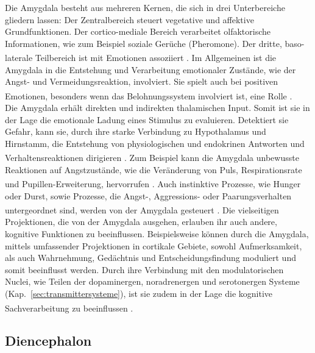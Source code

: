 \documentclass[12pt,a4paper,pdftex]{article}
\begin{document}
\noindent Die Amygdala besteht aus mehreren Kernen, die sich in drei Unterbereiche gliedern lassen: Der Zentralbereich steuert vegetative und affektive Grundfunktionen. Der cortico-mediale Bereich verarbeitet olfaktorische Informationen, wie zum Beispiel soziale Gerüche (Pheromone). Der dritte, baso-laterale Teilbereich ist mit Emotionen assoziiert \textsuperscript{\cite[6]{storch2012lehrbuchzoo}}. Im Allgemeinen ist die Amygdala in die Entstehung und Verarbeitung emotionaler Zustände, wie der Angst- und   Vermeidungsreaktion, involviert. Sie spielt auch bei positiven Emotionen, besonders wenn das Belohnungssystem involviert ist, eine Rolle \textsuperscript{\cite[48]{kandel2013principles}}.\\
Die Amygdala erhält direkten und indirekten thalamischen Input. Somit ist sie in der Lage die emotionale Ladung eines Stimulus zu evaluieren. Detektiert sie Gefahr, kann sie, durch ihre starke  Verbindung zu Hypothalamus und Hirnstamm, die Entstehung von physiologischen und endokrinen Antworten und Verhaltensreaktionen dirigieren \textsuperscript{\cite[48]{kandel2013principles}}. Zum Beispiel kann die Amygdala unbewusste Reaktionen auf Angstzustände, wie die Veränderung von Puls, Respirationsrate und Pupillen-Erweiterung,  hervorrufen \textsuperscript{\cite[15]{kandel2013principles}}.
Auch instinktive Prozesse, wie Hunger oder Durst, sowie Prozesse, die Angst-, Aggressions- oder Paarungsverhalten untergeordnet sind, werden von der Amygdala gesteuert \textsuperscript{\cite[18]{kandel2013principles}}.
Die vielseitigen Projektionen, die von der Amygdala ausgehen, erlauben ihr auch andere, kognitive Funktionen zu beeinflussen. Beispielsweise können durch die Amygdala, mittels umfassender Projektionen in cortikale Gebiete, sowohl Aufmerksamkeit, als auch Wahrnehmung, Gedächtnis und Entscheidungsfindung moduliert und somit beeinflusst werden. Durch ihre Verbindung mit den modulatorischen Nuclei, wie Teilen der dopaminergen, noradrenergen und serotonergen Systeme (Kap.~\ref{sec:transmittersysteme}), ist sie zudem in der Lage die kognitive Sachverarbeitung zu beeinflussen \textsuperscript{\cite[48]{kandel2013principles}}.


\subsection{Diencephalon}
\label{subsec:Diencephalon} 
\end{document}
